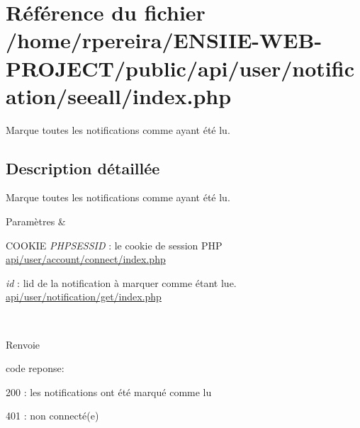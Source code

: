 \hypertarget{notification_2seeall_2index_8php}{}\section{Référence du fichier /home/rpereira/\+E\+N\+S\+I\+I\+E-\/\+W\+E\+B-\/\+P\+R\+O\+J\+E\+C\+T/public/api/user/notification/seeall/index.php}
\label{notification_2seeall_2index_8php}


Marque toutes les notifications comme ayant été lu.  




\subsection{Description détaillée}
Marque toutes les notifications comme ayant été lu. 


\begin{DoxyParams}{Paramètres}
{\em } & 
\begin{DoxyItemize}
\item C\+O\+O\+K\+IE {\itshape P\+H\+P\+S\+E\+S\+S\+ID} \+: le cookie de session P\+HP \hyperlink{account_2connect_2index_8php}{api/user/account/connect/index.\+php}
\item {\itshape id} \+: l\textquotesingle{}id de la notification à marquer comme étant lue. \hyperlink{notification_2get_2index_8php}{api/user/notification/get/index.\+php} 
\end{DoxyItemize}\\
\hline
\end{DoxyParams}
\begin{DoxyReturn}{Renvoie}

\begin{DoxyItemize}
\item code reponse\+:
\begin{DoxyItemize}
\item 200 \+: les notifications ont été marqué comme lu
\item 401 \+: non connecté(e) 
\end{DoxyItemize}
\end{DoxyItemize}
\end{DoxyReturn}
